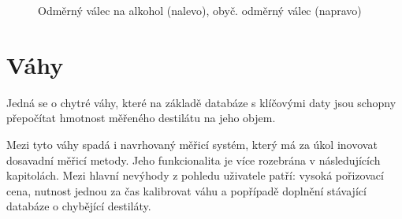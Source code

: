 \begin{figure}[H]
\begin{center}
    \end{center}
    \caption{Odměrný válec na alkohol (nalevo)\cite{Odměrný válec na alkohol}, obyč. odměrný válec (napravo)\cite{Odměrný válec}}
    \label{odměrné válce - obr}
\end{figure}



\section{Váhy}

Jedná se o chytré váhy, které na základě databáze s klíčovými daty jsou schopny přepočítat hmotnost měřeného destilátu na jeho objem. 

Mezi tyto váhy spadá i navrhovaný měřicí systém, který má za úkol inovovat dosavadní měřicí metody. Jeho funkcionalita je více rozebrána v následujících kapitolách. Mezi hlavní nevýhody z pohledu uživatele patří: vysoká pořizovací cena, nutnost jednou za čas kalibrovat váhu a popřípadě doplnění stávající databáze o chybějící destiláty.



%
%

